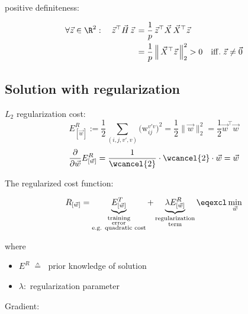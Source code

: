 \begin{frame}
positive definiteness:

\begin{align}
\forall \vec z \in \R^2: \quad \vec z^\top \vec H\, \vec z 
\, &= \frac{1}{p} \, \vec z^\top \vec X \, \vec X^\top \vec z\\
\, &= \frac{1}{p} \, \Big \lVert \, \vec X^\top \vec z \, \Big \rVert_2^2 > 0 \quad \mathrm{iff.} \; \vec z \ne \vec 0
\end{align}

\end{frame}

\subsection{Solution with regularization}

\begin{frame}

$L_2$ regularization cost:
\begin{equation}
E^R_{[\vec w]} := \frac{1}{2} \sum_{(i, j, v', v)} 
			\big( \mathrm{w}_{ij}^{v'v} \big)^2 = \frac{1}{2} \lVert \vec w \rVert_2^2 = \frac{1}{2} \vec w^\top \vec w 
\end{equation}
\renewcommand{\CancelColor}{\color{gray}}
\begin{equation}
\frac{\partial}{\partial \vec w} E^R_{[\vec w]} = \frac{1}{\wcancel{2}} \cdot \wcancel{2} \cdot \vec w = \vec w
\end{equation}

The regularized cost function:

\begin{equation}
	R_{[\vec{w}]} = \underbrace{ E_{[\vec{w}]}^T }_{
			\substack{\text{training} \\ \text{error} \\ \text{e.g. quadratic cost}}}
		+ \underbrace{ \lambda E_{[\vec{w}]}^R }_{
			\substack{\text{regularization} \\ \text{term}}}
		\eqexcl \min_{\vec w}
\end{equation}

where 
\begin{itemize}
	\item $E^R \; \corresponds \; $ prior knowledge of solution
	\item $\lambda:$ regularization parameter 
\end{itemize}

Gradient:


\end{frame}
